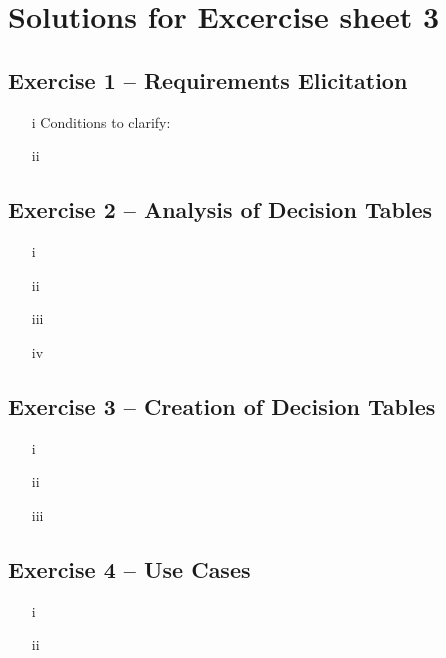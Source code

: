 \documentclass{scrartcl}
\begin{document}
\section*{Solutions for Excercise sheet 3}

\subsection*{Exercise 1 – Requirements Elicitation}
\begin{itemize}
	\item[i] Conditions to clarify:\\
	\item[ii]
	
\end{itemize}



\subsection*{Exercise 2 – Analysis of Decision Tables}

\begin{itemize}
	\item[i]
	\item[ii]
	\item[iii]
	\item[iv]
\end{itemize}

\subsection*{Exercise 3 – Creation of Decision Tables}

\begin{itemize}
	\item[i]
	\item[ii]
	\item[iii]
\end{itemize}
\subsection*{Exercise 4 – Use Cases}

\begin{itemize}
	\item[i]
	\item[ii]
\end{itemize}
\end{document}
